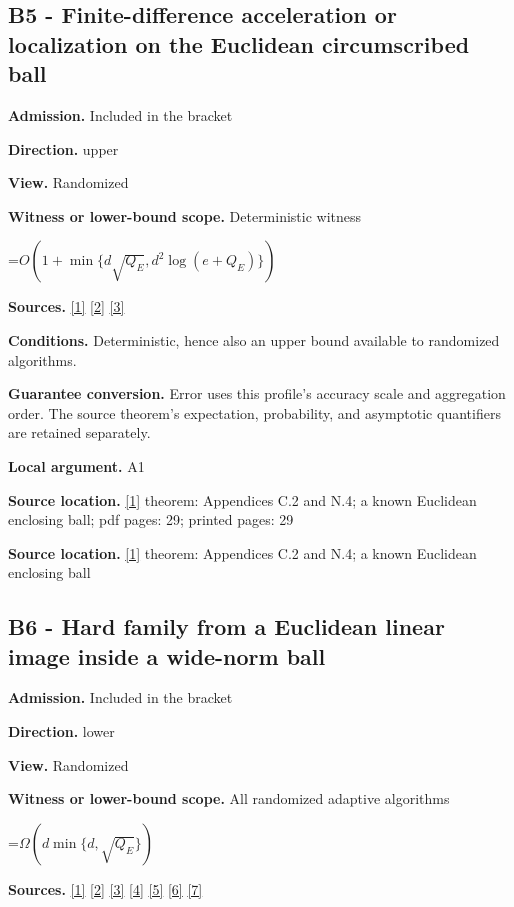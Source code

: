 \documentclass[10pt,a4paper]{article}
\newcommand{\AtlasMath}[1]{\par\begingroup\centering\setbox0=\hbox{$\displaystyle #1$}\ifdim\wd0>1.4\linewidth\typeout{ATLAS WIDE FORMULA: \the\wd0}\fi\ifdim\wd0>\linewidth\resizebox{\linewidth}{!}{\box0}\else\box0\fi\par\endgroup}
\begin{document}
\subsection{B5 - Finite-difference acceleration or localization on the Euclidean circumscribed ball}
\textbf{Admission.} Included in the bracket

\textbf{Direction.} upper

\textbf{View.} Randomized

\textbf{Witness or lower-bound scope.} Deterministic witness

\AtlasMath{O(1+\min\{d\sqrt{Q_E},d^2\log(e+Q_E)\})}
\textbf{Sources.} \href{https://arxiv.org/html/2610.00345v1}{[1]} \href{https://arxiv.org/html/2607.16558v2}{[2]} \href{https://www.mathnet.ru/php/archive.phtml?jrnid=mzm&option_lang=eng&paperid=1697&wshow=paper}{[3]}

\textbf{Conditions.} Deterministic, hence also an upper bound available to randomized algorithms.

\textbf{Guarantee conversion.} Error uses this profile's accuracy scale and aggregation order. The source theorem's expectation, probability, and asymptotic quantifiers are retained separately.

\textbf{Local argument.} A1

\textbf{Source location.} \href{https://arxiv.org/html/2610.00345v1}{[1]} theorem: Appendices C.2 and N.4; a known Euclidean enclosing ball; pdf pages: 29; printed pages: 29

\textbf{Source location.} \href{https://arxiv.org/html/2610.00345v1}{[1]} theorem: Appendices C.2 and N.4; a known Euclidean enclosing ball

\subsection{B6 - Hard family from a Euclidean linear image inside a wide-norm ball}
\textbf{Admission.} Included in the bracket

\textbf{Direction.} lower

\textbf{View.} Randomized

\textbf{Witness or lower-bound scope.} All randomized adaptive algorithms

\AtlasMath{\Omega(d\min\{d,\sqrt{Q_E}\})}
\textbf{Sources.} \href{https://arxiv.org/html/2610.00345v1}{[1]} \href{https://arxiv.org/html/2607.16558v2}{[2]} \href{https://www.mathnet.ru/php/archive.phtml?jrnid=mzm&option_lang=eng&paperid=1697&wshow=paper}{[3]} \href{https://arxiv.org/abs/1802.09022}{[4]} \href{https://proceedings.neurips.cc/paper_files/paper/2022/file/329ef22fd8cb68223d5df09a037f7dd9-Paper-Conference.pdf}{[5]} \href{https://jmlr.org/papers/volume18/16-632/16-632.pdf}{[6]} \href{https://arxiv.org/pdf/1707.08486v2}{[7]}
\end{document}
